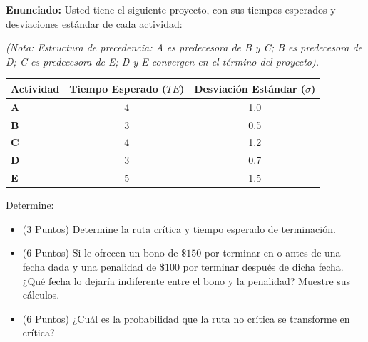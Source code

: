 \documentclass[11pt, a4paper]{article}
\begin{document}
  \textbf{Enunciado:}
  Usted tiene el siguiente proyecto, con sus tiempos esperados y desviaciones estándar de cada actividad:
  
  \begin{center}
  \end{center}

  \textit{(Nota: Estructura de precedencia: A es predecesora de B y C; B es predecesora de D; C es predecesora de E; D y E convergen en el término del proyecto).}

  \begin{center}
  \small
  \begin{tabular}{lcc}
    \toprule
    \textbf{Actividad} & \textbf{Tiempo Esperado ($TE$)} & \textbf{Desviación Estándar ($\sigma$)} \\
    \midrule
    \textbf{A} & 4 & 1.0 \\
    \textbf{B} & 3 & 0.5 \\
    \textbf{C} & 4 & 1.2 \\
    \textbf{D} & 3 & 0.7 \\
    \textbf{E} & 5 & 1.5 \\
    \bottomrule
  \end{tabular}
  \end{center}

  Determine:
  \begin{itemize}
    \item[\textbf{a)}] (3 Puntos) Determine la ruta crítica y tiempo esperado de terminación.
    \item[\textbf{b)}] (6 Puntos) Si le ofrecen un bono de $\$150$ por terminar en o antes de una fecha dada y una penalidad de $\$100$ por terminar después de dicha fecha. ¿Qué fecha lo dejaría indiferente entre el bono y la penalidad? Muestre sus cálculos.
    \item[\textbf{c)}] (6 Puntos) ¿Cuál es la probabilidad que la ruta no crítica se transforme en crítica?
  \end{itemize}
\end{document}
